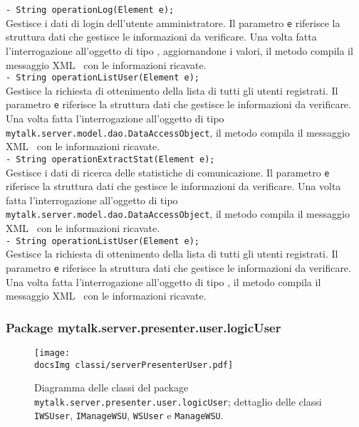 {{\begin{sloppypar}
{{{\begin{itemize}
{					\texttt{- String operationLog(Element e);}\\
					Gestisce i dati di login dell'utente amministratore. Il parametro \texttt{e} riferisce la struttura dati che gestisce le informazioni da verificare.
					Una volta fatta l'interrogazione all'oggetto di tipo , aggiornandone i valori, il metodo compila il messaggio XML\g~ con le informazioni ricavate.\\

					\texttt{- String operationListUser(Element e);}\\
					Gestisce la richiesta di ottenimento della lista di tutti gli utenti registrati. Il parametro \texttt{e} riferisce la struttura dati che gestisce le informazioni da verificare.
					Una volta fatta l'interrogazione all'oggetto di tipo \texttt{mytalk.server.model.dao.DataAccessObject}, il metodo compila il messaggio XML\g~ con le informazioni ricavate.\\
					
					\texttt{- String operationExtractStat(Element e);}\\
					Gestisce i dati di ricerca delle statistiche di comunicazione. Il parametro \texttt{e} riferisce la struttura dati che gestisce le informazioni da verificare.
					Una volta fatta l'interrogazione all'oggetto di tipo \texttt{mytalk.server.model.dao.DataAccessObject}, il metodo compila il messaggio XML\g~ con le informazioni ricavate.\\
					
					\texttt{- String operationListUser(Element e);}\\
					Gestisce la richiesta di ottenimento della lista di tutti gli utenti registrati. Il parametro \texttt{e} riferisce la struttura dati che gestisce le informazioni da verificare.
					Una volta fatta l'interrogazione all'oggetto di tipo , il metodo compila il messaggio XML\g~ con le informazioni ricavate.\\
				}
			\end{itemize}
		}
	}
	
	
	\subsubsection{Package mytalk.server.presenter.user.logicUser}{
	
		\begin{figure}[h!tbp]
		\centering
		\label{fig:presenterServerUser}
		\texttt{[image: \\docsImg classi/serverPresenterUser.pdf]}
		\caption{Diagramma delle classi del package \nolinkurl{mytalk.server.presenter.user.logicUser}; dettaglio delle classi \nolinkurl{IWSUser}, \nolinkurl{IManageWSU}, \nolinkurl{WSUser} e  \nolinkurl{ManageWSU}.}	
	\end{figure}	
	

}}
\end{sloppypar}}}

